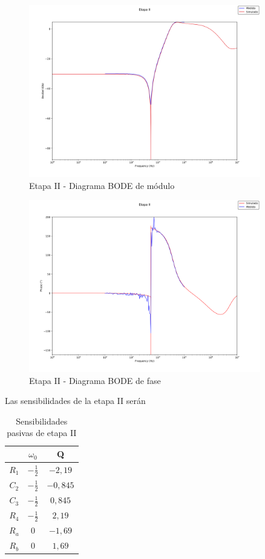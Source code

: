 \begin{figure}[H]
    \centering
    \includegraphics[width=0.9\textwidth]{../EJ3/Resources/stageII_ampbode.png}
    \caption{Etapa II - Diagrama BODE de m\'odulo}
     \label{EJ3_STAGEII_BODEAMP}
\end{figure}

\begin{figure}[H]
    \centering
    \includegraphics[width=0.9\textwidth]{../EJ3/Resources/stageII_phabode.png}
    \caption{Etapa II - Diagrama BODE de fase}
     \label{EJ3_STAGEII_BODEPHA}
\end{figure}

Las sensibilidades de la etapa II ser\'an

\begin{table}[H]
    \centering
    \begin{tabular}{c | c c}
         & $\omega_0$ & Q\\
        \hline
        $R_1$  & $-\frac{1}{2}$ & $-2,19$ \\
        $C_2$  & $-\frac{1}{2}$ & $-0,845$ \\
        $C_3$  & $-\frac{1}{2}$ & $0,845$\\
        $R_4$  & $-\frac{1}{2}$ & $2,19$ \\
        $R_a$  & $0$ & $-1,69$\\
        $R_b$  & $0$ & $1,69$\\
    \end{tabular}
    \caption{Sensibilidades pasivas de etapa II}
    \label{tabla_sensibilidades_pasivas_stageII}
\end{table}

